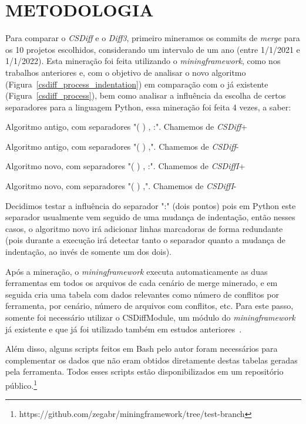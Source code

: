 \section{METODOLOGIA}\label{metodologia}

Para comparar o \emph{CSDiff} e o \emph{Diff3}, primeiro mineramos os commits
de \emph{merge} para os 10 projetos escolhidos, considerando um intervalo de um
ano (entre 1/1/2021 e 1/1/2022). Esta mineração foi feita utilizando o
\emph{miningframework}, como nos trabalhos anteriores e, com o objetivo de analisar o
novo algoritmo (Figura~\ref{csdiff_process_indentation}) em comparação com o já
existente (Figura~\ref{csdiff_process}), bem como analisar a influência da
escolha de certos separadores para a linguagem Python, essa mineração foi feita
4 vezes, a saber:

\begin{compactenum}[(1)]
	\item Algoritmo antigo, com separadores "( ) , :". Chamemos de \emph{CSDiff}+
	\item Algoritmo antigo, com separadores "( ) ,". Chamemos de \emph{CSDiff}-
	\item Algoritmo novo, com separadores "( ) , :". Chamemos de \emph{CSDiffI}+
	\item Algoritmo novo, com separadores "( ) ,". Chamemos de \emph{CSDiffI}-
\end{compactenum}

Decidimos testar a influência do separador ":" (dois pontos) pois em Python
este separador usualmente vem seguido de uma mudança de indentação, então
nesses casos, o algoritmo novo irá adicionar linhas marcadoras de forma
redundante (pois durante a execução irá detectar tanto o separador quanto a
mudança de indentação, ao invés de somente um dos dois).

Após a mineração, o \emph{miningframework} executa automaticamente as duas
ferramentas em todos os arquivos de cada cenário de merge minerado, e em
seguida cria uma tabela com dados relevantes como número de conflitos por
ferramenta, por cenário, número de arquivos com conflitos, etc. Para este
passo, somente foi necessário utilizar o CSDiffModule, um módulo do
\emph{miningframework} já existente e que já foi utilizado também em estudos
anteriores~\cite{heitor21}.

Além disso, alguns scripts feitos em Bash pelo autor foram necessários para
complementar os dados que não eram obtidos diretamente destas tabelas geradas
pela ferramenta. Todos esses scripts estão disponibilizados em um repositório
público.\footnote{https://github.com/zegabr/miningframework/tree/test-branch} %

